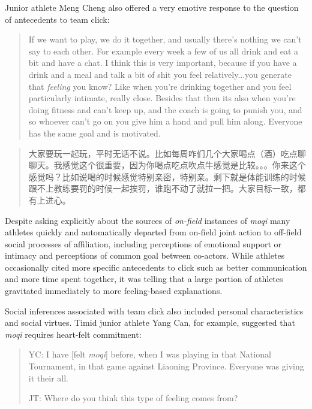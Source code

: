 \begin{CJK}{UTF8}{gbsn}
Junior athlete Meng Cheng also offered a very emotive response to the question of antecedents to team click:

      \begin{quote}
        If we want to play, we do it together, and usually there's nothing we can't say to each other.  For example every week a few of us all drink and eat a bit and have a chat.  I think this is very important, because if you have a drink and a meal and talk a bit of shit you feel relatively...you generate that \textit{feeling} you know? Like when you're drinking together and you feel particularly intimate, really close.  Besides that then its also when you're doing fitness and can't keep up, and the coach is going to punish you, and so whoever can't go on you give him a hand and pull him along.  Everyone has the same goal and is motivated.
      \end{quote}

      \begin{quote}
        大家要玩一起玩，平时无话不说。比如每周咋们几个大家喝点（酒）吃点聊聊天。我感觉这个很重要，因为你喝点吃点吹点牛感觉是比较。。。你来这个感觉吗？比如说喝的时候感觉特别亲密，特别亲。剩下就是体能训练的时候跟不上教练要罚的时候一起挨罚，谁跑不动了就拉一把。大家目标一致，都有上进心。
      \end{quote}

Despite asking explicitly about the sources of \textit{on-field} instances of \textit{moqi} many athletes quickly and automatically departed from on-field joint action to off-field social processes of affiliation, including perceptions of emotional support or intimacy and perceptions of common goal between co-actors. While athletes occasionally cited more specific antecedents to click such as better communication and more time spent together, it was telling that a large portion of athletes gravitated immediately to more feeling-based explanations.

Social inferences associated with team click also included personal characteristics and social virtues.  Timid junior athlete Yang Can, for example, suggested that \textit{moqi} requires heart-felt commitment:

    \begin{quote}
      YC: I have [felt \textit{moqi}] before, when I was playing in that National Tournament, in that game against Liaoning Province.  Everyone was giving it their all.

      JT: Where do you think this type of feeling comes from?


\end{quote}
\end{CJK}

